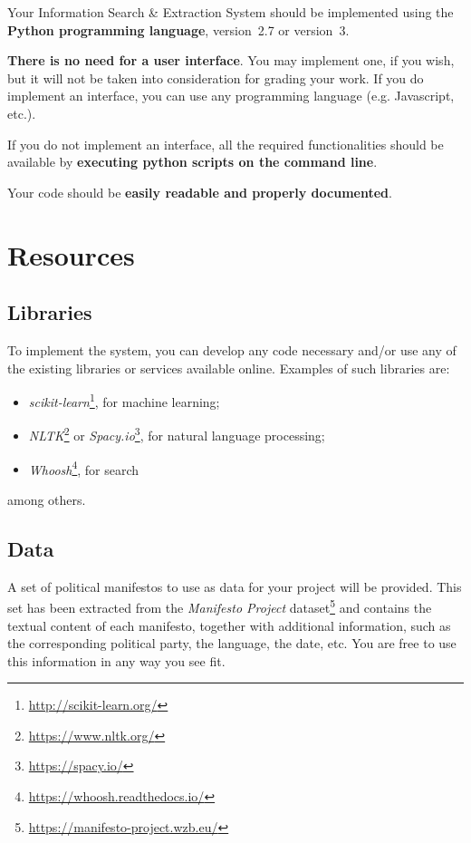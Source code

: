 \documentclass[12pt]{article}
\begin{document}
Your Information Search \& Extraction System should be implemented using the
\textbf{Python programming language}, version~2.7 or version~3.

\textbf{There is no need for a user interface}. You may implement one, if you
wish, but it will not be taken into consideration for grading your work. If
you do implement an interface, you can use any programming language
(e.g. Javascript, etc.).

If you do not implement an interface, all the required functionalities should
be available by \textbf{executing python scripts on the command line}.

Your code should be \textbf{easily readable and properly documented}.

\section{Resources}
\label{sec:resources}

\subsection*{Libraries}
\label{libraries}

To implement the system, you can develop any code necessary and/or use any of
the existing libraries or services available online. Examples of such libraries
are:
\begin{itemize}
\item \emph{scikit-learn}\footnote{\url{http://scikit-learn.org/}}, for machine
    learning;
\item \emph{NLTK}\footnote{\url{https://www.nltk.org/}} or
    \emph{Spacy.io}\footnote{\url{https://spacy.io/}}, for  natural language
    processing;
\item \emph{Whoosh}\footnote{\url{https://whoosh.readthedocs.io/}}, for search
\end{itemize}
among others.

\subsection*{Data}
\label{sec:data}

A set of political manifestos to use as data for your project will be
provided. This set has been extracted from the \emph{Manifesto Project}
dataset\footnote{\url{https://manifesto-project.wzb.eu/}} and contains the
textual content of each manifesto, together with additional information, such
as the corresponding political party, the language, the date, etc. You are
free to use this information in any way you see fit.
\end{document}
